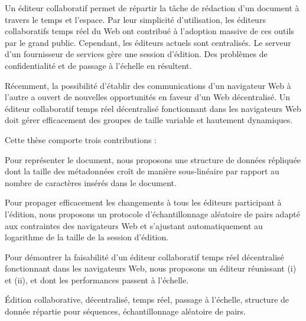 
\begin{resume}
  Un éditeur collaboratif permet de répartir la tâche de rédaction d'un document
  à travers le temps et l'espace. Par leur simplicité d'utilisation, les
  éditeurs collaboratifs temps réel du Web ont contribué à l'adoption massive
  de ces outils par le grand public. Cependant, les éditeurs actuels sont
  centralisés. Le serveur d'un fournisseur de services gère une session
  d'édition. Des problèmes de confidentialité et de passage à l'échelle en
  résultent.

  \noindent Récemment, la possibilité d'établir des communications d'un
  navigateur Web à l'autre a ouvert de nouvelles opportunités en faveur d'un Web
  décentralisé. Un éditeur collaboratif temps réel décentralisé fonctionnant
  dans les navigateurs Web doit gérer efficacement des groupes de taille
  variable et hautement dynamiques.

  \noindent Cette thèse comporte trois contributions :
  \begin{inparaenum}[(i)]
  \item Pour représenter le document, nous proposons une structure de données
    répliquée dont la taille des métadonnées croît de manière sous-linéaire par
    rapport au nombre de caractères insérés dans le document.
  \item Pour propager efficacement les changements à tous les éditeurs
    participant à l'édition, nous proposons un protocole d'échantillonnage
    aléatoire de pairs adapté aux contraintes des navigateurs Web et s'ajustant
    automatiquement au logarithme de la taille de la session d'édition.
  \item Pour démontrer la faisabilité d'un éditeur collaboratif temps réel
    décentralisé fonctionnant dans les navigateurs Web, nous proposons un
    éditeur réunissant (i) et (ii), et dont les performances passent à
    l'échelle.
  \end{inparaenum}
\end{resume}

\begin{motscles}
  Édition collaborative, décentralisé, temps réel, passage à l'échelle,
  structure de donnée répartie pour séquences, échantillonnage aléatoire de
  pairs.
\end{motscles}

